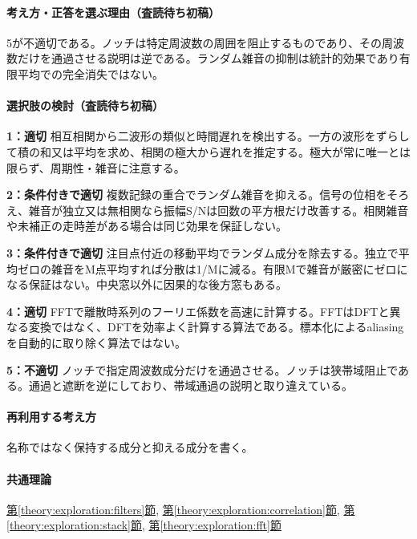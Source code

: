 \paragraph{考え方・正答を選ぶ理由（査読待ち初稿）} 5が不適切である。ノッチは特定周波数の周囲を阻止するものであり、その周波数だけを通過させる説明は逆である。ランダム雑音の抑制は統計的効果であり有限平均での完全消失ではない。

\paragraph{選択肢の検討（査読待ち初稿）}\mbox{}\par

\noindent\textbf{1：適切} 相互相関から二波形の類似と時間遅れを検出する。一方の波形をずらして積の和又は平均を求め、相関の極大から遅れを推定する。極大が常に唯一とは限らず、周期性・雑音に注意する。\par

\noindent\textbf{2：条件付きで適切} 複数記録の重合でランダム雑音を抑える。信号の位相をそろえ、雑音が独立又は無相関なら振幅S/Nは回数の平方根だけ改善する。相関雑音や未補正の走時差がある場合は同じ効果を保証しない。\par

\noindent\textbf{3：条件付きで適切} 注目点付近の移動平均でランダム成分を除去する。独立で平均ゼロの雑音をM点平均すれば分散は1/Mに減る。有限Mで雑音が厳密にゼロになる保証はない。中央窓以外に因果的な後方窓もある。\par

\noindent\textbf{4：適切} FFTで離散時系列のフーリエ係数を高速に計算する。FFTはDFTと異なる変換ではなく、DFTを効率よく計算する算法である。標本化によるaliasingを自動的に取り除く算法ではない。\par

\noindent\textbf{5：不適切} ノッチで指定周波数成分だけを通過させる。ノッチは狭帯域阻止である。通過と遮断を逆にしており、帯域通過の説明と取り違えている。\par

\paragraph{再利用する考え方} 名称ではなく保持する成分と抑える成分を書く。

\paragraph{共通理論} \hyperref[theory:exploration:filters]{第\ref*{theory:exploration:filters}節}, \hyperref[theory:exploration:correlation]{第\ref*{theory:exploration:correlation}節}, \hyperref[theory:exploration:stack]{第\ref*{theory:exploration:stack}節}, \hyperref[theory:exploration:fft]{第\ref*{theory:exploration:fft}節}

